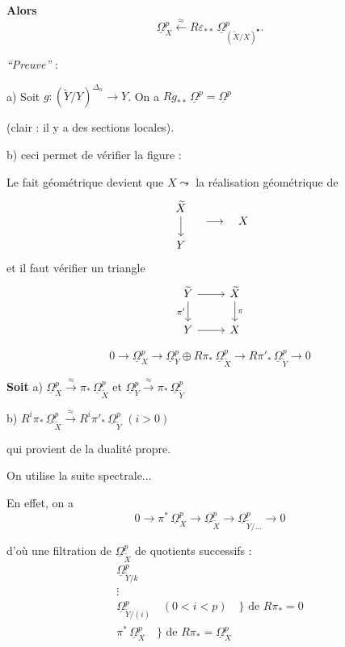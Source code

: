 \documentclass[11pt,a4paper]{article}
\theoremstyle{plain}
\theoremstyle{definition}
\begin{document}
\noindent\textbf{Alors}
\[
\underline{\Omega}^{p}_{X} \xleftarrow{\;\approx\;} R\varepsilon_{**}\, \underline{\Omega}^{p}_{(\widetilde{X}/X)^{\bullet}}.
\]

\noindent\textit{``Preuve''} :

a) Soit $g : (\widetilde{Y}/Y)^{\Delta_{n}} \to Y$. On a $Rg_{**}\, \underline{\Omega}^{p} = \underline{\Omega}^{p}$

(clair : il y a des sections locales).

b) ceci permet de v\'erifier la figure :

\newpage

Le fait g\'eom\'etrique devient que $X \leadsto$ la r\'ealisation g\'eom\'etrique de
\[
\begin{tikzcd}
\widetilde{X} \arrow[d] \\
Y
\end{tikzcd}
\quad \longrightarrow \quad X
\]
et il faut v\'erifier un triangle
\[
\begin{tikzcd}
\widetilde{Y} \arrow[r] \arrow[d, "\pi'"'] & \widetilde{X} \arrow[d, "\pi"] \\
Y \arrow[r] & X
\end{tikzcd}
\]

\vspace{0.3cm}

\[
0 \longrightarrow \underline{\Omega}^{p}_{X} \longrightarrow \underline{\Omega}^{p}_{Y} \oplus R\pi_{*}\,\underline{\Omega}^{p}_{\widetilde{X}} \longrightarrow R\pi'_{*}\,\underline{\Omega}^{p}_{\widetilde{Y}} \longrightarrow 0
\]

\noindent\textbf{Soit}
a) $\underline{\Omega}^{p}_{X} \xrightarrow{\;\approx\;} \pi_{*}\,\underline{\Omega}^{p}_{\widetilde{X}}$ et $\underline{\Omega}^{p}_{Y} \xrightarrow{\;\approx\;} \pi_{*}\,\underline{\Omega}^{p}_{\widetilde{Y}}$

b) $R^{i}\pi_{*}\,\underline{\Omega}^{p}_{\widetilde{X}} \xrightarrow{\;\approx\;} R^{i}\pi'_{*}\,\underline{\Omega}^{p}_{\widetilde{Y}}$ $(i > 0)$

qui provient de la dualit\'e propre.

\vspace{0.3cm}

On utilise la suite spectrale...

En effet, on a
\[
0 \longrightarrow \pi^{*}\,\underline{\Omega}^{p}_{X} \longrightarrow \underline{\Omega}^{p}_{\widetilde{X}} \longrightarrow \underline{\Omega}^{p}_{\widetilde{Y}/\ldots} \longrightarrow 0
\]

d'o\`u une filtration de $\underline{\Omega}^{p}_{\widetilde{X}}$ de quotients successifs :
\[
\begin{array}{c}
\underline{\Omega}^{p}_{\widetilde{Y}/k} \\
\vdots \\
\underline{\Omega}^{p}_{\widetilde{Y}/(i)} \quad (0 < i < p) \quad \big\rbrace \text{ de } R\pi_{*} = 0 \\[0.3cm]
\pi^{*}\,\underline{\Omega}^{p}_{X} \quad \big\rbrace \text{ de } R\pi_{*} = \underline{\Omega}^{p}_{X}
\end{array}
\]
\end{document}

